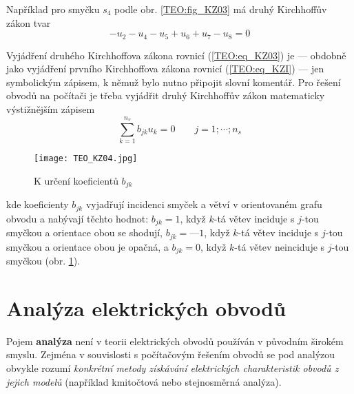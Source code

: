 {      Například pro smyčku \(s_4\) podle obr. \ref{TEO:fig_KZ03} má druhý Kirchhoffův zákon tvar
      \begin{equation*}
        -u_2 -u_4 -u_5 +u_6 +u_7 -u_8 = 0
      \end{equation*}
      
      Vyjádření druhého Kirchhoffova zákona rovnicí (\ref{TEO:eq_KZ03}) je — obdobně jako vyjádření 
      prvního Kirchhoffova zákona rovnicí (\ref{TEO:eq_KZI}) — jen symbolickým zápisem, k němuž 
      bylo nutno připojit slovní komentář. Pro řešení obvodů na počítači je třeba vyjádřit druhý 
      Kirchhoffův zákon matematicky výstižnějším zápisem
      \begin{equation}\label{TEO:eq_KZ04}
        \sum\limits_{k=1}^{n_v} b_{jk} u_k = 0 \qquad j=1;\cdots; n_s
      \end{equation}      
      \begin{figure}[ht!]
        \centering
        \texttt{[image: TEO\_KZ04.jpg]}
        \caption{K určení koeficientů \(b_{jk}\) \cite[s.~49]{Meyer1978}}
        \label{TEO:fig_KZ04}
      \end{figure}      
      kde koeficienty \(b_{jk}\) vyjadřují incidenci smyček a větví v orientovaném grafu obvodu a 
      nabývají těchto hodnot: \(b_{jk} = 1\), když \(k\)-tá větev inciduje s \(j\)-tou smyčkou a 
      orientace obou se shodují, \(b_{jk} = — 1\), když \(k\)-tá větev inciduje s \(j\)-tou smyčkou 
      a orientace obou je opačná, a \(b_{jk} = 0\), když \(k\)-tá větev neinciduje s \(j\)-tou 
      smyčkou (obr. \ref{TEO:fig_KZ04}).
      
  \section{Analýza elektrických obvodů}
    Pojem \textbf{analýza} není v teorii elektrických obvodů používán v původním širokém smyslu. 
    Zejména v souvislosti s počítačovým řešením obvodů se pod analýzou obvykle rozumí 
    \emph{konkrétní metody získávání elektrických charakteristik obvodů z jejich modelů} (například 
    kmitočtová nebo stejnosměrná analýza).
    
}
